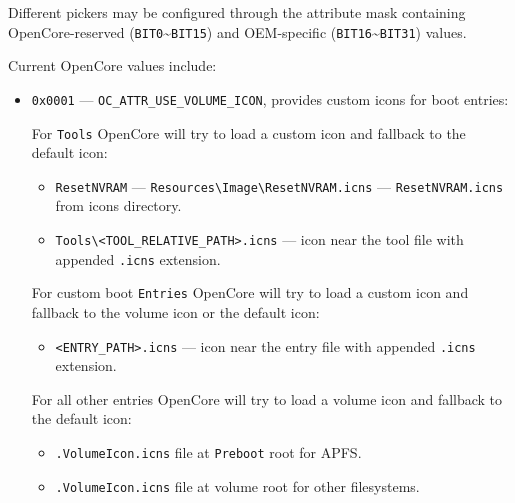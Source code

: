 \documentclass[]{article}
\providecommand{\tightlist}{%
  \setlength{\itemsep}{0pt}\setlength{\parskip}{0pt}}
\begin{document}
\begin{enumerate}
  Different pickers may be configured through the attribute mask containing
  OpenCore-reserved (\texttt{BIT0}\textasciitilde\texttt{BIT15}) and OEM-specific
  (\texttt{BIT16}\textasciitilde\texttt{BIT31}) values.

  Current OpenCore values include:

  \begin{itemize}
  \tightlist
  \item \texttt{0x0001} --- \texttt{OC\_ATTR\_USE\_VOLUME\_ICON}, provides custom icons
    for boot entries:

    For \texttt{Tools} OpenCore will try to load a custom icon and fallback to the default icon:
    \begin{itemize}
    \tightlist
      \item \texttt{ResetNVRAM} --- \texttt{Resources\textbackslash Image\textbackslash ResetNVRAM.icns}
        --- \texttt{ResetNVRAM.icns} from icons directory.
      \item \texttt{Tools\textbackslash <TOOL\_RELATIVE\_PATH>.icns}
        --- icon near the tool file with appended \texttt{.icns} extension.
    \end{itemize} \medskip

    For custom boot \texttt{Entries} OpenCore will try to load a custom icon and fallback
    to the volume icon or the default icon:
    \begin{itemize}
    \tightlist
      \item \texttt{<ENTRY\_PATH>.icns} --- icon near the entry file with appended \texttt{.icns} extension.
    \end{itemize} \medskip

    For all other entries OpenCore will try to load a volume icon and fallback to the default icon:
    \begin{itemize}
    \tightlist
      \item \texttt{.VolumeIcon.icns} file at \texttt{Preboot} root for APFS.
      \item \texttt{.VolumeIcon.icns} file at volume root for other filesystems.
    \end{itemize} \medskip


\end{itemize}
\end{enumerate}
\end{document}
